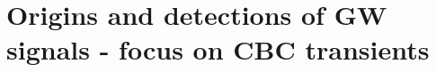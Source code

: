 \documentclass[11pt]{article}
\begin{document}













    

\section{Origins and detections of \ac{GW} signals - focus on \ac{CBC} transients}
\end{document}
